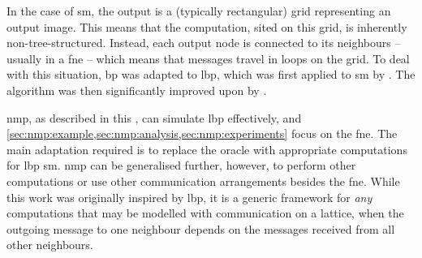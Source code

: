 In the case of \gls{sm}, the output is a (typically rectangular) grid representing an output image.  This means that the computation, sited on this grid, is inherently non-tree-structured.  Instead, each output node is connected to its neighbours -- usually in a \gls{fne} -- which means that messages travel in loops on the grid.  To deal with this situation, \gls{bp} was adapted to \gls{lbp}, which was first applied to \gls{sm} by \citeauthor{Sun2003} \cite{Sun2003}.  The algorithm was then significantly improved upon by \citeauthor{Felzenszwalb2006} \cite{Felzenszwalb2006}.

\Gls{nmp}, as described in this , can simulate \gls{lbp} effectively, and \cref{sec:nmp:example,sec:nmp:analysis,sec:nmp:experiments} focus on the \gls{fne}.  The main adaptation required is to replace the oracle with appropriate computations for \gls{lbp} \gls{sm}.  \Gls{nmp} can be generalised further, however, to perform other computations or use other communication arrangements besides the \gls{fne}.  While this work was originally inspired by \gls{lbp}, it is a generic framework for \emph{any} computations that may be modelled with communication on a lattice, when the outgoing message to one neighbour depends on the messages received from all other neighbours.
